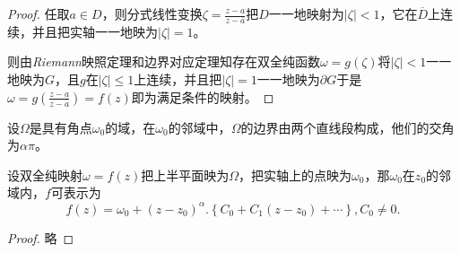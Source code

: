     \begin{proof}
    任取$a \in D$，则分式线性变换$\zeta  =\frac{z-a}{z-\overline a}$把$D$一一地映射为$\left | \zeta  \right | < 1$，它在$\overline D$上连续，并且把实轴一一地映为$\left | \zeta \right | = 1$。\par
    则由\emph{Riemann}映照定理和边界对应定理知存在双全纯函数$\omega = g\left(\zeta \right )$将$\left | \zeta \right | < 1$一一地映为$G$，且$g$在$\left | \zeta \right | \le 1$上连续，并且把$\left | \zeta \right | = 1$一一地映为$\partial G$于是$\omega = g (\frac{z-a}{z-\overline a})=f \left ( z\right )$即为满足条件的映射。
 	\end{proof}
\begin{theorem}\label{5E}
     设$\Omega$是具有角点$\omega_0$的域，在$\omega_0$的邻域中，$\Omega$的边界由两个直线段构成，他们的交角为$\alpha \pi$。\par
    设双全纯映射$\omega = f \left ( z\right )$把上半平面映为$\Omega$，把实轴上的点映为$\omega_0$，那$\omega_0$在$z_0$的邻域内，$f$可表示为
   \begin{equation*}
   f(z)=\omega_0 +(z-z_0)^\alpha .\left \{ C_0+C_1(z-z_0)+\cdots \right\},C_0 \neq 0.
   \end{equation*}
   \end{theorem}
   \begin{proof}
    略
 	\end{proof}
